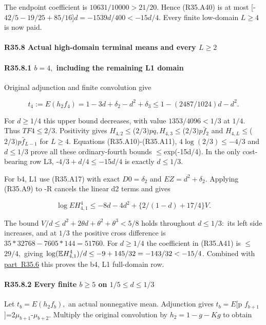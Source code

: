 The endpoint coefficient is \(10631/10000>21/20.\) Hence (R35.A40) is at most
[-\(42/5-19/25+85/16\)]\(d=-1539d/400<-15d/4.\)
Every finite low-domain \(L\ge 4\) is now paid.

\paragraph{R35.8 Actual high-domain terminal means and every \(L\ge 2\)}

\paragraph{R35.8.1 \(b=4,\allowbreak \) including the remaining L1 domain}

Original adjunction and finite convolution give

\[
t_4:=E(h_2f_4)=1-3d+\delta_2-d^2+\delta_3
\le1-(2487/1024)d-d^2.
\]

For \(d\ge 1/4\) this upper bound decreases, with value \(1353/4096<1/3\) at \(1/4.\) Thus \(TF4\le 2/3.\) Positivity gives \(H_{4,\allowbreak  2}\)\ensuremath{\le}(\(2/3)pq,\allowbreak  H_{4,\allowbreak  3}\)\ensuremath{\le}(\(2/3)p\bar f_2\) and \(H_{4,\allowbreak  L}\)\ensuremath{\le}(\(2/3) p\bar f_{L-1}\) for \(L\ge 4.\)
Equations (R35.A10)-(R35.A11), \(4\log(2/3)\le -4/3\) and \(d\le 1/3\) prove all these ordinary-fourth bounds \ensuremath{\le}exp(-15d/4). In the only cost-bearing row L3, -\(4/3+d/4\le -15d/4\) is exactly \(d\le 1/3.\)

For b4, L1 use (R35.A17) with exact \(D0=\delta_2\) and \(EZ=d^2+\delta_2.\) Applying (R35.A9) to -R cancels the linear d2 terms and gives

\[
\log EH_{4,1}^4\le-8d-4d^2+\{2/(1-d)+17/4\}V. \tag{R35.A41}
\]

The bound \(V/d\le d^2+2\theta d+\theta^2+\theta^3<5/8\) holds throughout \(d\le 1/3:\) its left side increases, and at \(1/3\) the positive cross difference is
\(35*32768-7605*144=51760.\)
For \(d\ge 1/4\) the coefficient in (R35.A41) is \ensuremath{\le}\(29/4,\allowbreak \) giving
\(\log(\mathbb E H_{4,\allowbreak 1}^4)/d\le-9+145/32=-143/32<-15/4\).
Combined with \mbox{\hyperref[part:R35.6]{part R35.6}} this proves the b4, L1 full-domain row.

\paragraph{R35.8.2 Every finite \(b\ge 5\) on \(1/5\le d\le 1/3\)}

Let \(t_b=E(h_{2} f_b),\allowbreak \) an actual nonnegative mean. Adjunction gives
\(t_b=E\)[p \(f_{b+1}\)]=2\(\mu_{b+1}\)-\(\mu_{b+2}\).
Multiply the original convolution by \(h_{2}=1-g-Kg\) to obtain

